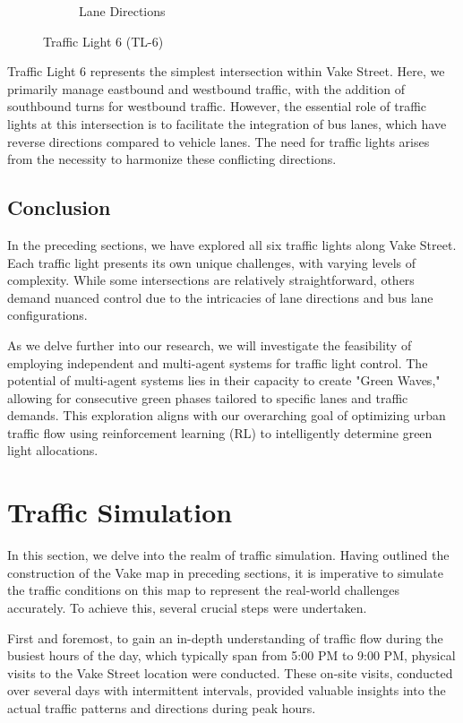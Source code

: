 \begin{figure}[h]
\begin{subfigure}{0.45\textwidth}
        \caption{Lane Directions}
    \end{subfigure}
    \caption{Traffic Light 6 (TL-6)}
    \label{fig:tl-6}
\end{figure}

Traffic Light 6 represents the simplest intersection within Vake Street. Here, we primarily manage eastbound and westbound traffic, with the addition of southbound turns for westbound traffic. However, the essential role of traffic lights at this intersection is to facilitate the integration of bus lanes, which have reverse directions compared to vehicle lanes. The need for traffic lights arises from the necessity to harmonize these conflicting directions.

\subsection{Conclusion}
In the preceding sections, we have explored all six traffic lights along Vake Street. Each traffic light presents its own unique challenges, with varying levels of complexity. While some intersections are relatively straightforward, others demand nuanced control due to the intricacies of lane directions and bus lane configurations.

As we delve further into our research, we will investigate the feasibility of employing independent and multi-agent systems for traffic light control. The potential of multi-agent systems lies in their capacity to create "Green Waves," allowing for consecutive green phases tailored to specific lanes and traffic demands. This exploration aligns with our overarching goal of optimizing urban traffic flow using reinforcement learning (RL) to intelligently determine green light allocations.

\section{Traffic Simulation} \label{sec:traffic-simulation}

In this section, we delve into the realm of traffic simulation. Having outlined the construction of the Vake map in preceding sections, it is imperative to simulate the traffic conditions on this map to represent the real-world challenges accurately. To achieve this, several crucial steps were undertaken.

First and foremost, to gain an in-depth understanding of traffic flow during the busiest hours of the day, which typically span from 5:00 PM to 9:00 PM, physical visits to the Vake Street location were conducted. These on-site visits, conducted over several days with intermittent intervals, provided valuable insights into the actual traffic patterns and directions during peak hours.

